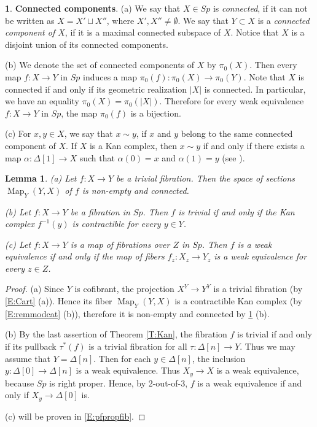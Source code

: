 \documentclass[12pt]{amsart}
\theoremstyle{plain}
\newtheorem{Lem}[Thm]{Lemma}
\theoremstyle{definition}
\newtheorem{Emp}[Thm]{}
\numberwithin{equation}{section}
\newcommand{\Dt}{\Delta}
\newcommand{\al}{\alpha}
\newcommand{\re}[1]{\ref{E:#1}}
\newcommand{\rt}[1] {Theorem \ref{T:#1}}
\newcommand{\Map}{\operatorname{Map}}
\begin{document}
\begin{Emp} \label{E:pi0}
{\bf Connected components}. (a) We say that $X\in Sp$ is {\em
connected}, if it can not be written as $X=X'\sqcup X''$, where
$X',X''\neq\emptyset$. We say that $Y\subset X$ is a {\em
connected component of $X$}, if it is a maximal connected subspace
of $X$. Notice that $X$ is a disjoint union of its connected
components.

(b) We denote the set of connected components of $X$ by $\pi_0(X)$. Then every
map $f:X\to Y$ in $Sp$ induces a map
$\pi_0(f):\pi_0(X)\to\pi_0(Y)$. Note
that $X$ is connected if and only if its geometric realization
$|X|$ is connected. In particular, we have an equality
$\pi_0(X)=\pi_0(|X|)$. Therefore for every weak equivalence
$f:X\to Y$ in $Sp$, the map $\pi_0(f)$ is a bijection.

(c) For $x,y\in X$, we say that $x\sim y$, if $x$ and $y$ belong to the
same connected component of $X$. If $X$ is a Kan complex,
then $x\sim y$ if and only if there exists a map $\al:\Dt[1]\to X$
such that $\al(0)=x$ and $\al(1)=y$ (see \cite[Lem 6.1]{GJ}).
\end{Emp}

\begin{Lem} \label{L:propfib}
(a) Let $f:X\to Y$ be a trivial fibration. Then the space of
sections $\Map_Y(Y,X)$ of $f$ is non-empty and connected.

(b) Let $f:X\to Y$ be a fibration in $Sp$. Then $f$ is trivial if
and only if the Kan complex $f^{-1}(y)$ is contractible for every
$y\in Y$.

(c) Let $f:X\to Y$ is a map of fibrations over $Z$ in $Sp$. Then
$f$ is a weak equivalence if and only if the map of fibers
$f_z:X_z\to Y_z$ is a weak equivalence for every $z\in Z$.
\end{Lem}

\begin{proof}
(a) Since $Y$ is cofibrant, the projection $X^Y\to Y^Y$ is a
trivial fibration (by \re{Cart} (a)). Hence its fiber
$\Map_Y(Y,X)$ is a contractible Kan complex (by \re{remmodcat}
(b)), therefore it is non-empty and connected by \re{pi0} (b).

(b) By the last assertion of \rt{Kan}, the fibration $f$ is
trivial if and only if its pullback $\tau^*(f)$ is a trivial
fibration for all $\tau:\Dt[n]\to Y$. Thus we may assume that
$Y=\Dt[n]$. Then for each $y\in\Dt[n]$, the inclusion
$y:\Dt[0]\to\Dt[n]$ is a weak equivalence. Thus $X_y\to X$ is a
weak equivalence, because $Sp$ is right proper. Hence, by
2-out-of-3,  $f$ is a weak equivalence if and only if
$X_y\to\Dt[0]$ is.

(c) will  be proven in \re{pfpropfib}.
\end{proof}
\end{document}
